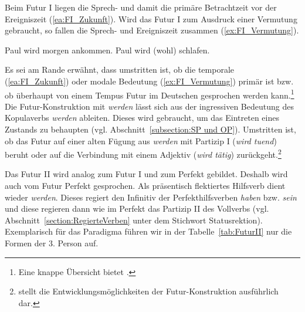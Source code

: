 Beim Futur I liegen die Sprech- und damit die primäre Betrachtzeit vor der Ereigniszeit (\ref{ea:FI_Zukunft}). Wird das Futur I zum Ausdruck einer Vermutung gebraucht, so fallen die Sprech- und Ereigniszeit zusammen (\ref{ex:FI_Vermutung}).

\ea \label{ea:FI}
\ea \label{ea:FI_Zukunft} Paul wird morgen ankommen.
\ex \label{ex:FI_Vermutung} Paul wird (wohl) schlafen.
\z 
\z 

Es sei am Rande erwähnt, dass umstritten ist, ob die temporale (\ref{ea:FI_Zukunft}) oder modale Bedeutung (\ref{ex:FI_Vermutung}) primär ist bzw. ob überhaupt von einem Tempus Futur im Deutschen gesprochen werden kann.\footnote{Eine knappe Übersicht bietet \citet[97--104]{Bogner2009}.} Die Futur-Konstruktion mit \textit{werden} lässt sich aus der ingressiven Bedeutung des Kopulaverbs \textit{werden} ableiten. Dieses wird gebraucht, um das Eintreten eines Zustands zu behaupten (vgl. Abschnitt~\ref{subsection:SP und OP}). Umstritten ist, ob das Futur auf einer alten Fügung aus \textit{werden} mit Partizip I (\textit{wird tuend}) beruht oder auf die Verbindung mit einem Adjektiv (\textit{wird tätig}) zurückgeht.\footnote{\citet[377--399]{Welke2005Temp} stellt die Entwicklungsmöglichkeiten der Futur-Konstruktion ausführlich dar.}

\label{subsubsubsection:FuturII}

Das Futur II wird analog zum Futur I und zum Perfekt gebildet. Deshalb wird auch vom Futur Perfekt gesprochen. Als präsentisch flektiertes Hilfsverb dient wieder \textit{werden}. Dieses regiert den Infinitiv der Perfekthilfsverben \textit{haben} bzw. \textit{sein} und diese regieren dann wie im Perfekt das Partizip II des Vollverbs (vgl. Abschnitt~\ref{section:RegierteVerben} unter dem Stichwort Statusrektion). Exemplarisch für das Paradigma führen wir in der Tabelle~\ref{tab:FuturII} nur die Formen der 3. Person auf.

\begin{table}
  \centering
  \caption{Ausschnitt aus dem Paradigma Futur II}
  \label{tab:FuturII}
\end{table}

